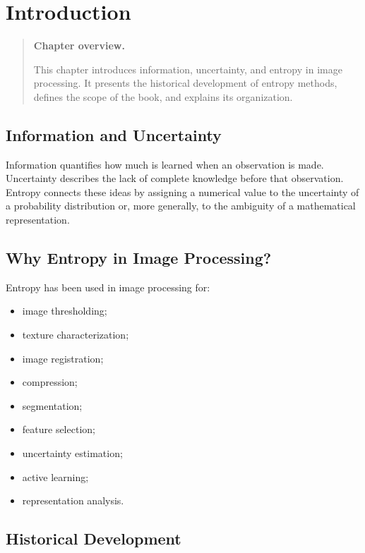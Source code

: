 \documentclass[11pt,oneside]{book}
\theoremstyle{remark}
\newenvironment{chapteroverview}
{
	\begin{quote}
		\small
		\textbf{Chapter overview.}
	}
	{
	\end{quote}
}
\begin{document}
	
	\chapter{Introduction}
	\label{chap:introduction}
	
	\begin{chapteroverview}
		This chapter introduces information, uncertainty, and entropy in image
		processing. It presents the historical development of entropy methods,
		defines the scope of the book, and explains its organization.
	\end{chapteroverview}
	
	\section{Information and Uncertainty}
	
	Information quantifies how much is learned when an observation is made.
	Uncertainty describes the lack of complete knowledge before that observation.
	Entropy connects these ideas by assigning a numerical value to the uncertainty
	of a probability distribution or, more generally, to the ambiguity of a
	mathematical representation.
	
	\section{Why Entropy in Image Processing?}
	
	Entropy has been used in image processing for:
	
	\begin{itemize}
		\item image thresholding;
		\item texture characterization;
		\item image registration;
		\item compression;
		\item segmentation;
		\item feature selection;
		\item uncertainty estimation;
		\item active learning;
		\item representation analysis.
	\end{itemize}
	
	\section{Historical Development}
	
\end{document}
